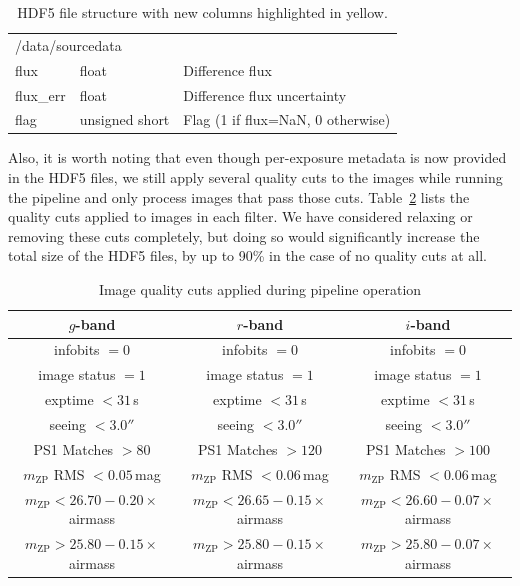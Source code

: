 \documentclass[12pt]{article}
\begin{document}
\begin{enumerate}
\begin{table}[ht!]
\begin{tabular}{ |p{3.5cm}p{2.5cm}p{9cm}| }
     \hline
     \multicolumn{3}{|l|}{\hspace{0.5cm}/data/sourcedata} \\
     \hspace{1.0cm}flux       &   float           &   Difference flux \\
     \hspace{1.0cm}flux\_err  &   float           &   Difference flux uncertainty \\
     \hspace{1.0cm}flag       &   unsigned short  &   Flag (1 if flux=NaN, 0 otherwise) \\
     \hline
    \end{tabular}
    \caption{HDF5 file structure with new columns highlighted in yellow.}
    \label{tab:hdf5_new}
    \end{table}

    Also, it is worth noting that even though per-exposure metadata is now provided in the HDF5 files, we still apply several quality cuts to the images while running the pipeline and only process images that pass those cuts. Table~\ref{tab:constraints} lists the quality cuts applied to images in each filter. We have considered relaxing or removing these cuts completely, but doing so would significantly increase the total size of the HDF5 files, by up to 90\% in the case of no quality cuts at all.

    \begin{table}[ht!]
    \centering
    \footnotesize
    \begin{tabular}{ c|c|c }
     \hline
     $g$-band & $r$-band & $i$-band \\
     \hline
     infobits $=0$         &   infobits $=0$        &   infobits $=0$       \\
     image status $=1$     &   image status $=1$    &   image status $=1$   \\
     exptime $<31$\,s      &   exptime $<31$\,s     &   exptime $<31$\,s    \\
     seeing $<3.0''$       &   seeing $<3.0''$      &   seeing $<3.0''$     \\
     PS1 Matches $>80$    &   PS1 Matches $>120$    &   PS1 Matches $>100$  \\
     $m_{\mathrm{ZP}}$ RMS $<0.05$\,mag      &   $m_{\mathrm{ZP}}$ RMS $<0.06$\,mag     &   $m_{\mathrm{ZP}}$ RMS $<0.06$\,mag    \\
     $m_{\mathrm{ZP}} < 26.70-0.20\times$airmass      &   $m_{\mathrm{ZP}} < 26.65-0.15\times$airmass     &   $m_{\mathrm{ZP}} < 26.60-0.07\times$airmass    \\
     $m_{\mathrm{ZP}} > 25.80-0.15\times$airmass      &   $m_{\mathrm{ZP}} > 25.80-0.15\times$airmass     &   $m_{\mathrm{ZP}} > 25.80-0.07\times$airmass    \\
    \end{tabular}
    \caption{Image quality cuts applied during pipeline operation}
    \label{tab:constraints}
    \end{table}


\end{enumerate}
\end{document}
